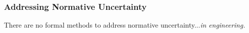 \begin{frame}
    \frametitle{Addressing Normative Uncertainty}


    
    There are no formal methods to address normative uncertainty...\pause \textit{in engineering.}

\end{frame}
